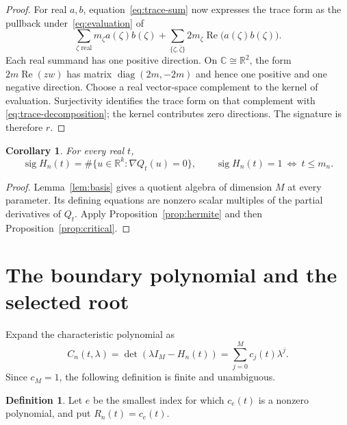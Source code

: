 \documentclass[11pt,leqno]{amsart}
\newtheorem{corollary}[theorem]{Corollary}
\theoremstyle{definition}
\newtheorem{definition}[theorem]{Definition}
\theoremstyle{remark}
\numberwithin{equation}{section}
\newcommand{\R}{\mathbb R}
\newcommand{\C}{\mathbb C}
\newcommand{\sig}{\operatorname{sig}}
\newcommand{\diag}{\operatorname{diag}}
\begin{document}
\begin{proof}
For real $a,b$, equation~\eqref{eq:trace-sum} now expresses the trace
form as the pullback under~\eqref{eq:evaluation} of
\begin{equation}\label{eq:trace-decomposition}
 \sum_{\zeta\text{ real}}m_\zeta a(\zeta)b(\zeta)
 +\sum_{\{\zeta,\bar\zeta\}}2m_\zeta
       \operatorname{Re}\bigl(a(\zeta)b(\zeta)\bigr).
\end{equation}
Each real summand has one positive direction. On $\C\cong\R^2$,
the form $2m\operatorname{Re}(zw)$ has matrix
$\diag(2m,-2m)$ and hence one positive and one negative direction.
Choose a real vector-space complement to the kernel of evaluation.
Surjectivity identifies the trace form on that complement with
\eqref{eq:trace-decomposition}; the kernel contributes zero directions.
The signature is therefore $r$.
\end{proof}

\begin{corollary}\label{cor:signature-threshold}
For every real $t$,
\begin{equation}\label{eq:signature-threshold}
 \sig H_n(t)
 =\#\{u\in\R^k:\nabla Q_t(u)=0\},
 \qquad
 \sig H_n(t)=1\ \Longleftrightarrow\ t\leq m_n.
\end{equation}
\end{corollary}

\begin{proof}
Lemma~\ref{lem:basis} gives a quotient algebra of dimension $M$ at every
parameter. Its defining equations are nonzero scalar multiples of the
partial derivatives of $Q_t$. Apply Proposition~\ref{prop:hermite} and
then Proposition~\ref{prop:critical}.
\end{proof}

\section{The boundary polynomial and the selected root}\label{sec:selection}

Expand the characteristic polynomial as
\begin{equation}\label{eq:C}
 C_n(t,\lambda)=\det(\lambda I_M-H_n(t))
              =\sum_{j=0}^{M}c_j(t)\lambda^j.
\end{equation}
Since $c_M=1$, the following definition is finite and unambiguous.

\begin{definition}\label{def:R}
Let $e$ be the smallest index for which $c_e(t)$ is a nonzero polynomial,
and put $R_n(t)=c_e(t)$.
\end{definition}
\end{document}
